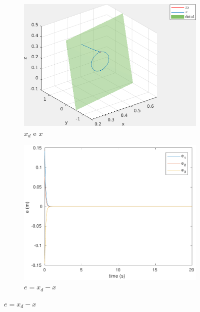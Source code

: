 \documentclass[a4paper,11pt]{article}
\theoremstyle{mytheor}
\begin{document}
\begin{figure}[!ht]
\centering
  \begin{minipage}{\linewidth}
  \centering
    \begin{subfigure}[b]{1\textwidth}
    \includegraphics[width=1\textwidth]{figs/ex1_c_1_x.png}
    \caption{$x_d$ e $x$}
    \label{fig:ex1_c_1_x}
    \end{subfigure}
  \end{minipage}
  \begin{minipage}{\linewidth}
  \centering
    \begin{subfigure}[b]{0.45\textwidth}
    \includegraphics[width=1\textwidth]{figs/ex1_c_1_e.pdf}
    \caption{$e = x_d - x$}
    \label{fig:ex1_c_1_e}
    \end{subfigure}

\end{minipage}
\end{figure}
\end{document}
